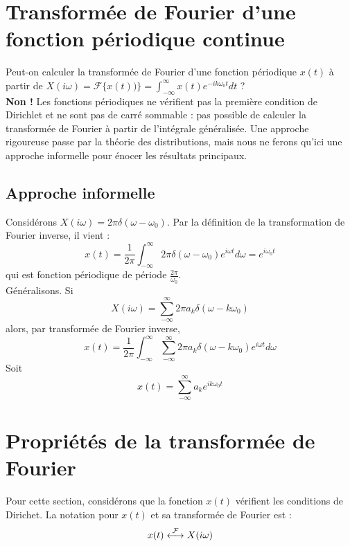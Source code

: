 \section{Transformée de Fourier d'une fonction périodique continue}
Peut-on calculer la transformée de Fourier d'une fonction périodique 
$x(t)$ à partir de $X(i\omega) = \mathcal{F}\{x(t))\} = \int_{-\infty}
^\infty x(t)e^{-ik\omega_0t}dt$ ?\\
\textbf{Non !} Les fonctions périodiques ne vérifient pas la première 
condition de Dirichlet et ne sont pas de carré sommable : pas possible 
de calculer la transformée de Fourier à partir de l’intégrale généralisée.
Une approche rigoureuse passe par la théorie des distributions, mais nous
ne ferons qu'ici une approche informelle pour énocer les résultats 
principaux.

	\subsection{Approche informelle}
	Considérons $X(i\omega) = 2\pi\delta(\omega-\omega_0)$. Par la 
	définition de la transformation de Fourier inverse, il vient :
	\begin{equation}
	x(t) = \frac{1}{2\pi}\int_{-\infty}^\infty 2\pi\delta(\omega-
	\omega_0)e^{i\omega t}d\omega = e^{i\omega_0 t}
	\end{equation}
	qui est fonction périodique de période $\frac{2\pi}{\omega_0}$.\\
	Généralisons. Si 
	\begin{equation}
	X(i\omega) = \sum_{-\infty}^\infty 2\pi a_k\delta(\omega-k\omega_0)
	\end{equation}
	alors, par transformée de Fourier inverse,
	\begin{equation}
	x(t) = \frac{1}{2\pi}\int_{-\infty}^\infty \sum_{-\infty}^\infty 2\pi 
	a_k\delta(\omega-k\omega_0)e^{i\omega t}d\omega
	\end{equation}
	Soit
	\begin{equation}
	x(t) = \sum_{-\infty}^\infty a_ke^{ik\omega_0t}
	\end{equation}
	
\section{Propriétés de la transformée de Fourier}
Pour cette section, considérons que la fonction $x(t)$ vérifient les 
conditions de Dirichet. La notation pour $x(t)$ et sa transformée de 
Fourier est :
\begin{equation}
x(t) \ft X(i\omega)
\end{equation}


